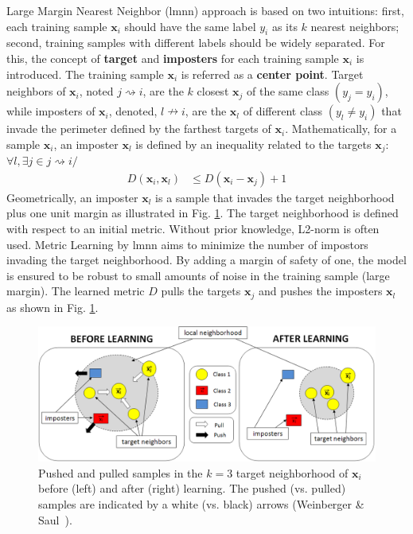 Large Margin Nearest Neighbor ({\sc lmnn}) approach is based on two intuitions: first, each training sample $\textbf{x}_i$ should have the same label $y_i$ as its $k$ nearest neighbors; second, training samples with different labels should be widely separated. For this, the concept of \textbf{target} and \textbf{imposters} for each training sample $\textbf{x}_i$ is introduced. The training sample $\textbf{x}_i$ is referred as a \textbf{center point}. Target neighbors of $\textbf{x}_i$, noted $j \rightsquigarrow i$, are the $k$ closest $\textbf{x}_j$ of the same class $(y_j=y_i)$, while imposters of $\textbf{x}_i$, denoted, $l \nrightarrow i$, are the $\textbf{x}_l$ of different class $(y_l \neq y_i)$ that invade the perimeter defined by the farthest targets of $\textbf{x}_i$. 
Mathematically, for a sample $\textbf{x}_i$, an imposter $\textbf{x}_l$ is defined by an inequality related to the targets $\textbf{x}_j$: $\forall l, \exists j \in j \rightsquigarrow i /$
\begin{align}
D(\textbf{x}_i,\textbf{x}_l) &\leq D(\textbf{x}_i-\textbf{x}_j) + 1
\end{align}
Geometrically, an imposter $\textbf{x}_{l}$ is a sample that invades the target neighborhood plus one unit margin as illustrated in Fig. \ref{fig:TargetImposterRepresentation}. The target neighborhood is defined with respect to an initial metric. Without prior knowledge, L2-norm is often used. Metric Learning by {\sc lmnn} aims to minimize the number of impostors invading the target neighborhood. By adding a margin of safety of one, the model is ensured to be robust to small amounts of noise in the training sample (large margin). The learned metric $D$ pulls the targets $\textbf{x}_j$ and pushes the imposters $\textbf{x}_{l}$ as shown in Fig. \ref{fig:TargetImposterRepresentation}.

\begin{figure}[h!]
	\centering
	\begin{minipage}[b]{0.85\linewidth}		
		\centerline{\includegraphics[width=0.8\linewidth]{./images/TargetImposterRepresentationCao}}
	\end{minipage}
	\caption{Pushed and pulled samples in the $k=3$ target neighborhood of $\textbf{x}_i$ before (left) and after (right) learning. The pushed (vs. pulled) samples are indicated by a white (vs. black) arrows (Weinberger \& Saul~\cite{Weinberger2009}).}
	\label{fig:TargetImposterRepresentation}
\end{figure}

